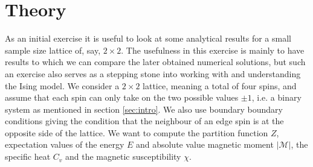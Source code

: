 \documentclass[12pt]{article}
\numberwithin{figure}{section}
\numberwithin{table}{section}
\begin{document}
\section{Theory}
As an initial exercise it is useful to look at some analytical results for a small sample size lattice of, say, $2\times2$. The usefulness in this exercise is mainly to have results to which we can compare the later obtained numerical solutions, but such an exercise also serves as a stepping stone into working with and understanding the Ising model. We consider a $2\times2$ lattice, meaning a total of four spins, and assume that each spin can only take on the two possible values $\pm 1$, i.e. a binary system as mentioned in section \ref{sec:intro}. We also use boundary boundary conditions giving the condition that the neighbour of an edge spin is at the opposite side of the lattice. We want to compute the partition function $Z$, expectation values of the energy $E$ and absolute value magnetic moment $|\mathcal{M}|$, the specific heat $C_v$ and the magnetic susceptibility $\chi$.
\vspace{0.30cm}
\end{document}
